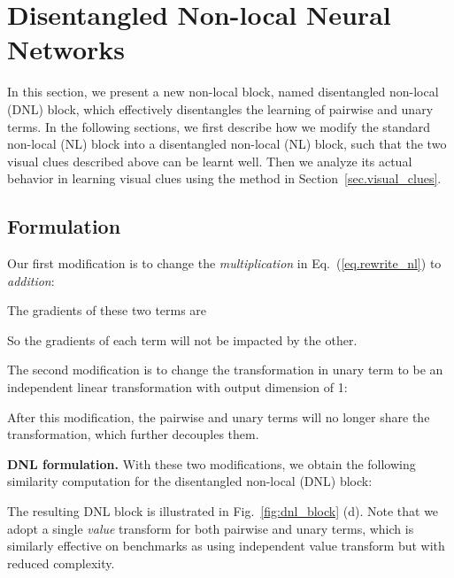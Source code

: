 \documentclass[runningheads]{llncs}
\begin{document}
\section{Disentangled Non-local Neural Networks}

In this section, we present a new non-local block, named disentangled non-local (DNL) block, which effectively disentangles the learning of pairwise and unary terms. In the following sections, we first describe how we modify the standard non-local (NL) block into a disentangled non-local (NL) block, such that the two visual clues described above can be learnt well. Then we analyze its actual behavior in learning visual clues using the method in Section~\ref{sec.visual_clues}.

\subsection{Formulation}

\label{sec.dnl_formulation}

Our first modification is to change the \emph{multiplication} in Eq.~(\ref{eq.rewrite_nl}) to \emph{addition}:
\begin{small}

\vspace{-10pt}
\end{small}

The gradients of these two terms are
\begin{small}

\end{small}
So the gradients of each term will not be impacted by the other.

The second modification is to change the transformation  in unary term to be an independent linear transformation  with output dimension of 1:
\begin{small}

\end{small}After this modification, the pairwise and unary terms will no longer share the  transformation, which further decouples them.

\noindent \textbf{DNL formulation.} With these two modifications, we obtain the following similarity computation for the disentangled non-local (DNL) block:
\begin{small}

\end{small}The resulting DNL block is illustrated in Fig.~\ref{fig:dnl_block} (d). Note that we adopt a single \emph{value} transform for both pairwise and unary terms, which is similarly effective on benchmarks as using independent value transform but with reduced complexity.
\end{document}
